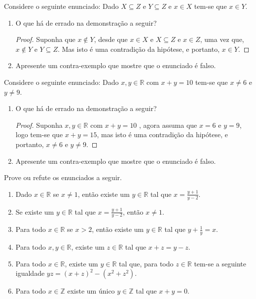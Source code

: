 \begin{exercise}\label{exerc:Demonstracao4}
	Considere o seguinte enunciado: Dado $X \subseteq Z$ e $Y \subseteq Z$ e $x \in X$ tem-se que $x \in Y$.
\end{exercise}

\begin{enumerate}
	\item O que há de errado na demonstração a seguir?
	\begin{proof}
		Suponha que $x \notin Y$, desde que $x \in X$ e $X \subseteq Z$ e $x \in Z$, uma vez que, $x \notin Y$ e $Y \subseteq Z$. Mas isto é uma contradição da hipótese, e portanto, $x \in Y$.
	\end{proof}
	\item Apresente um contra-exemplo que mostre que o enunciado é falso.
\end{enumerate}

\begin{exercise}\label{exerc:Demonstracao5}
	Considere o seguinte enunciado: Dado $x, y \in \mathbb{R}$ com $x + y = 10$ tem-se que $x \neq 6$ e $y \neq 9$.
\end{exercise}

\begin{enumerate}
	\item O que há de errado na demonstração a seguir?
	\begin{proof}
		Suponha $x, y \in \mathbb{R}$ com $x + y = 10$ , agora assuma que $x = 6$ e $y = 9$, logo tem-se que $x+y = 15$, mas isto é uma contradição da hipótese, e portanto, $x \neq 6$ e $y \neq 9$.
	\end{proof}
	\item Apresente um contra-exemplo que mostre que o enunciado é falso.
\end{enumerate}

\begin{exercise}\label{exerc:Demosntracao6}
	Prove ou refute os enunciados a seguir.
\end{exercise}

\begin{enumerate}
	\item Dado $x \in \mathbb{R}$ se $x \neq 1$, então existe um $y \in \mathbb{R}$ tal que $\displaystyle x = \frac{y+1}{y - 2}$.
	\item Se  existe um $y \in \mathbb{R}$ tal que $\displaystyle x = \frac{y+1}{y - 2}$, então $x \neq 1$.
	\item Para todo $x \in \mathbb{R}$ se $x > 2$, então existe um $y \in \mathbb{R}$ tal que $\displaystyle y + \frac{1}{y} = x$.
	\item Para todo $x, y \in \mathbb{R}$, existe um $z \in \mathbb{R}$ tal que $x + z = y - z$.
	\item Para todo $x \in \mathbb{R}$, existe um $y \in \mathbb{R}$ tal que, para todo $z \in \mathbb{R}$ tem-se a seguinte igualdade $yz = (x + z)^2 - (x^2 + z^2)$.
	\item Para todo $x \in \mathbb{Z}$ existe um único $y \in \mathbb{Z}$ tal que $x + y = 0$.
\end{enumerate}
